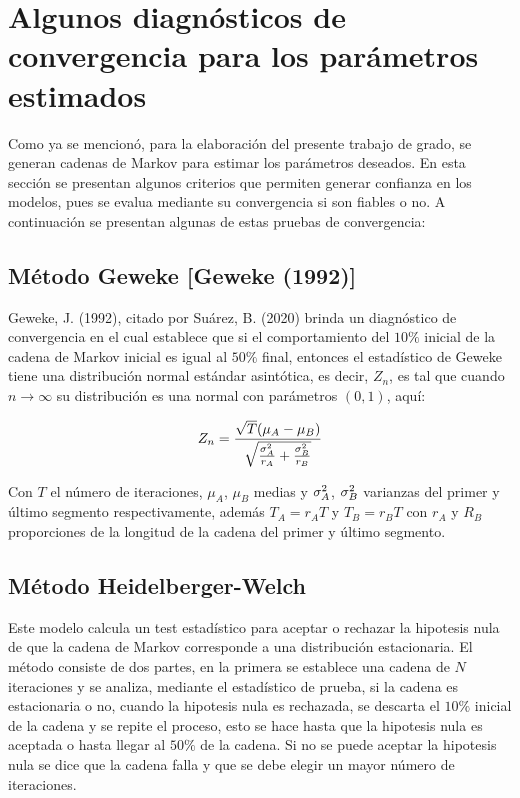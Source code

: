 \section{Algunos diagnósticos de convergencia para los parámetros estimados}




Como ya se mencionó, para la elaboración del presente trabajo de grado, se generan cadenas de Markov para estimar los parámetros deseados. En esta sección se presentan algunos criterios que permiten generar confianza en los modelos, pues se evalua mediante su convergencia si son fiables o no. A continuación se presentan algunas de estas pruebas de convergencia:

 

\subsection{Método Geweke [Geweke (1992)]}

Geweke, J. (1992), \cite{geweke} citado por Suárez, B. (2020) \cite{tesisbiviana}  brinda un diagnóstico de convergencia en el cual establece que si el comportamiento del $10\%$ inicial de la cadena de Markov inicial es igual al $50\%$ final, entonces el estadístico de Geweke tiene una distribución normal estándar asintótica, es decir, $Z_n$, es tal que cuando $n\rightarrow \infty$ su distribución es una normal con parámetros $(0,1)$, aquí:


\begin{equation}
\label{estadistico}
Z_n=\frac{\sqrt{T}(\mu_A-\mu_B)}{\sqrt{\frac{\sigma_A^2}{r_A}+\frac{\sigma_B^2}{r_B}}}
\end{equation}

Con $T$ el número de iteraciones, $\mu_A$, $\mu_B$ medias y $\sigma_A^2$, $\sigma_B^2$ varianzas del primer y último segmento respectivamente, además $T_A=r_AT$ y  $T_B=r_BT$ con $r_A$ y $R_B$ proporciones de la longitud de la cadena del primer y último segmento. 


\subsection{Método Heidelberger-Welch}

Este modelo calcula un test estadístico para aceptar o rechazar la hipotesis nula de que la cadena de Markov corresponde a una distribución estacionaria. El método consiste de dos partes, en la primera se establece una cadena de $N$ iteraciones y se analiza, mediante el estadístico de prueba, si la cadena es estacionaria o no, cuando la hipotesis nula es rechazada, se descarta el $10\%$ inicial de la cadena y se repite el proceso, esto se hace hasta que la hipotesis nula es aceptada o hasta llegar al $50\%$ de la cadena. Si no se puede aceptar la hipotesis nula se dice que la cadena falla y que se debe elegir un mayor número de iteraciones. 

